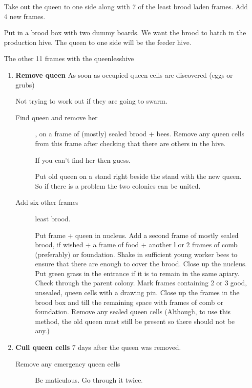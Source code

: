 Take out the queen to one side along with 7 of the least brood laden frames.  
Add 4 new frames.


Put in a brood box with two dummy boards.
We want the brood to hatch in the production hive.
The queen to one side will be the feeder hive.

The other 11 frames with the queenlesshive

\begin{enumerate}

\item \textbf{Remove queen}
As soon as occupied queen cells are discovered (eggs or grubs)

Not trying to work out if they are going to swarm.

\begin{description}
  \item[Find queen and remove her], on a frame of (mostly) sealed brood + bees. Remove any queen cells from this frame after checking that there are others in the hive.

If you can't find her then guess.

Put old queen on a stand right beside the stand with the new queen.
So if there is a problem the two colonies can be united.

  \item[Add six other frames] least brood.
  
Put frame + queen in nucleus.
Add a second frame of mostly sealed brood, if wished + a frame of food + another l or 2
frames of comb (preferably) or foundation.
Shake in sufficient young worker bees to ensure that there are enough to cover the brood.
Close up the nucleus. Put green grass in the entrance if it is to remain in the same apiary.
Check through the parent colony.  Mark frames containing 2 or 3 good, unsealed, queen cells with a drawing pin.
Close up the frames in the brood box and till the remaining space with frames of comb or foundation.
Remove any sealed queen cells (Although, to use this method, the old queen must still be present so there should not be any.)
 \end{description}
 
 
\item \textbf{Cull queen cells}
7 days after the queen was removed.

\begin{description}
  \item[Remove any emergency queen cells] Be maticulous.  Go through it twice.
  

\end{description}
\end{enumerate}
